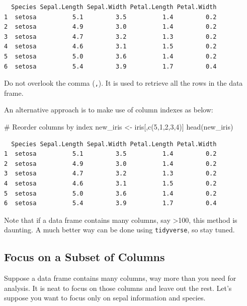 \documentclass[
  letterpaper,
  DIV=11,
  numbers=noendperiod]{scrreprt}
\newenvironment{Shaded}{\begin{snugshade}}{\end{snugshade}}
\newcommand{\CommentTok}[1]{\textcolor[rgb]{0.37,0.37,0.37}{#1}}
\newcommand{\DecValTok}[1]{\textcolor[rgb]{0.68,0.00,0.00}{#1}}
\newcommand{\FunctionTok}[1]{\textcolor[rgb]{0.28,0.35,0.67}{#1}}
\newcommand{\NormalTok}[1]{\textcolor[rgb]{0.00,0.23,0.31}{#1}}
\newcommand{\OtherTok}[1]{\textcolor[rgb]{0.00,0.23,0.31}{#1}}
\begin{document}
\begin{verbatim}
  Species Sepal.Length Sepal.Width Petal.Length Petal.Width
1  setosa          5.1         3.5          1.4         0.2
2  setosa          4.9         3.0          1.4         0.2
3  setosa          4.7         3.2          1.3         0.2
4  setosa          4.6         3.1          1.5         0.2
5  setosa          5.0         3.6          1.4         0.2
6  setosa          5.4         3.9          1.7         0.4
\end{verbatim}

Do not overlook the comma (\texttt{,}). It is used to retrieve all the
rows in the data frame.

An alternative approach is to make use of column indexes as below:

\begin{Shaded}
\begin{Highlighting}[]
\CommentTok{\# Reorder columns by index}
\NormalTok{new\_iris }\OtherTok{\textless{}{-}}\NormalTok{ iris[,}\FunctionTok{c}\NormalTok{(}\DecValTok{5}\NormalTok{,}\DecValTok{1}\NormalTok{,}\DecValTok{2}\NormalTok{,}\DecValTok{3}\NormalTok{,}\DecValTok{4}\NormalTok{)]}
\FunctionTok{head}\NormalTok{(new\_iris)}
\end{Highlighting}
\end{Shaded}

\begin{verbatim}
  Species Sepal.Length Sepal.Width Petal.Length Petal.Width
1  setosa          5.1         3.5          1.4         0.2
2  setosa          4.9         3.0          1.4         0.2
3  setosa          4.7         3.2          1.3         0.2
4  setosa          4.6         3.1          1.5         0.2
5  setosa          5.0         3.6          1.4         0.2
6  setosa          5.4         3.9          1.7         0.4
\end{verbatim}

Note that if a data frame contains many columns, say \textgreater100,
this method is daunting. A much better way can be done using
\texttt{tidyverse}, so stay tuned.

\subsection{Focus on a Subset of
Columns}\label{focus-on-a-subset-of-columns}

Suppose a data frame contains many columns, way more than you need for
analysis. It is neat to focus on those columns and leave out the rest.
Let's suppose you want to focus only on sepal information and species.
\end{document}
